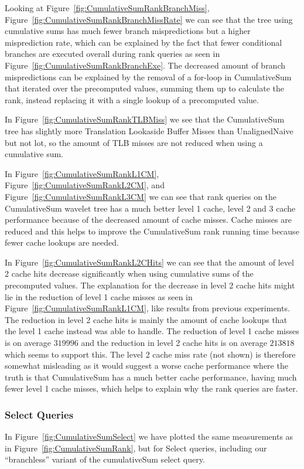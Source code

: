 Looking at Figure~\ref{fig:CumulativeSumRankBranchMiss}, Figure~\ref{fig:CumulativeSumRankBranchMissRate} we can see that the tree using cumulative sums has much fewer branch mispredictions but a higher misprediction rate, which can be explained by the fact that fewer conditional branches are executed overall during rank queries as seen in Figure~\ref{fig:CumulativeSumRankBranchExe}.
The decreased amount of branch mispredictions can be explained by the removal of a for-loop in CumulativeSum that iterated over the precomputed values, summing them up to calculate the rank, instead replacing it with a single lookup of a precomputed value.

In Figure~\ref{fig:CumulativeSumRankTLBMiss} we see that the CumulativeSum tree has slightly more Translation Lookaside Buffer Misses than UnalignedNaive but not lot, so the amount of TLB misses are not reduced when using a cumulative sum.

In Figure~\ref{fig:CumulativeSumRankL1CM}, Figure~\ref{fig:CumulativeSumRankL2CM}, and Figure~\ref{fig:CumulativeSumRankL3CM} we can see that rank queries on the CumulativeSum wavelet tree has a much better level 1 cache, level 2 and 3 cache performance because of the decreased amount of cache misses.
Cache misses are reduced and this helps to improve the CumulativeSum rank running time because fewer cache lookups are needed.

In Figure~\ref{fig:CumulativeSumRankL2CHits} we can see that the amount of level 2 cache hits decrease significantly when using cumulative sums of the precomputed values.
The explanation for the decrease in level 2 cache hits might lie in the reduction of level 1 cache misses as seen in Figure~\ref{fig:CumulativeSumRankL1CM}, like results from previous experiments.
The reduction in level 2 cache hits is mainly the amount of cache lookups that the level 1 cache instead was able to handle.
The reduction of level 1 cache misses is on average $\num{319996}$ and the reduction in level 2 cache hits is on average $\num{213818}$ which seems to support this.
The level 2 cache miss rate (not shown) is therefore somewhat misleading as it would suggest a worse cache performance where the truth is that CumulativeSum has a much better cache performance, having much fewer level 1 cache misses, which helps to explain why the rank queries are faster.



\subsubsection{Select Queries}
\label{sec:cumulativeSumExperimentSelectQueries}
In Figure~\ref{fig:CumulativeSumSelect} we have plotted the same measurements as in Figure~\ref{fig:CumulativeSumRank}, but for Select queries, including our “branchless” variant of the cumulativeSum select query.

